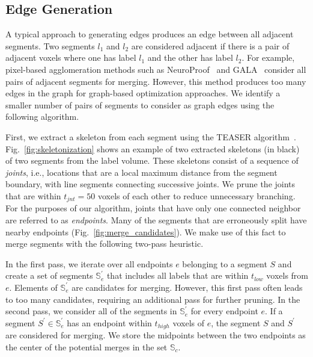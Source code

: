 \subsection{Edge Generation}

A typical approach to generating edges produces an edge between all adjacent segments. Two segments $l_1$ and $l_2$ are considered adjacent if there is a pair of adjacent voxels where one has label $l_1$ and the other has label $l_2$.
For example, pixel-based agglomeration methods such as NeuroProof~\cite{10.1371/journal.pone.0125825} and GALA~\cite{nunez2014graph} consider all pairs of adjacent segments for merging.
However, this method produces too many edges in the graph for graph-based optimization approaches. We identify a smaller number of pairs of segments to consider as graph edges using the following algorithm.

First, we extract a skeleton from each segment using the TEASER algorithm~\cite{sato2000teasar,zhao2014automatic}. Fig.~\ref{fig:skeletonization} shows an example of two extracted skeletons (in black) of two segments from the label volume. These skeletons consist of a sequence of \textit{joints}, i.e., locations that are a local maximum distance from the segment boundary, with line segments connecting successive joints. We prune the joints that are within $t_{jnt} = 50$ voxels of each other to reduce unnecessary branching. For the purposes of our algorithm, joints that have only one connected neighbor are referred to as \textit{endpoints}. Many of the segments that are erroneously split have nearby endpoints  (Fig.~\ref{fig:merge_candidates}). We make use of this fact to merge segments with the following two-pass heuristic.

In the first pass, we iterate over all endpoints $e$ belonging to a segment $S$ and create a set of segments $\mathbb{S}_e^\prime$ that includes all labels that are within $t_{low}$ voxels from $e$. Elements of $\mathbb{S}_e^\prime$ are candidates for merging. However, this first pass often leads to too many candidates, requiring an additional pass for further pruning. In the second pass, we consider all of the segments in $\mathbb{S}_e^\prime$ for every endpoint $e$. If a segment $S^\prime \in \mathbb{S}_e^\prime$ has an endpoint within $t_{high}$ voxels of $e$, the segment $S$ and $S^\prime$ are considered for merging. We store the midpoints between the two endpoints as the center of the potential merges in the set $\mathbb{S}_c$.


